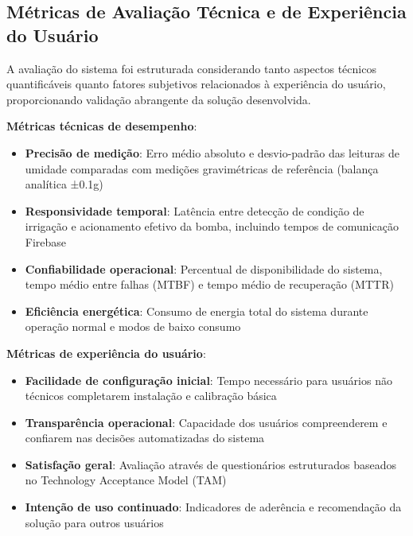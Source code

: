 
\subsection{Métricas de Avaliação Técnica e de Experiência do Usuário}

A avaliação do sistema foi estruturada considerando tanto aspectos técnicos quantificáveis quanto fatores subjetivos relacionados à experiência do usuário, proporcionando validação abrangente da solução desenvolvida.

\textbf{Métricas técnicas de desempenho}:
\begin{itemize}
\item \textbf{Precisão de medição}: Erro médio absoluto e desvio-padrão das leituras de umidade comparadas com medições gravimétricas de referência (balança analítica ±0.1g)
\item \textbf{Responsividade temporal}: Latência entre detecção de condição de irrigação e acionamento efetivo da bomba, incluindo tempos de comunicação Firebase
\item \textbf{Confiabilidade operacional}: Percentual de disponibilidade do sistema, tempo médio entre falhas (MTBF) e tempo médio de recuperação (MTTR)
\item \textbf{Eficiência energética}: Consumo de energia total do sistema durante operação normal e modos de baixo consumo
\end{itemize}

\textbf{Métricas de experiência do usuário}:
\begin{itemize}
\item \textbf{Facilidade de configuração inicial}: Tempo necessário para usuários não técnicos completarem instalação e calibração básica
\item \textbf{Transparência operacional}: Capacidade dos usuários compreenderem e confiarem nas decisões automatizadas do sistema
\item \textbf{Satisfação geral}: Avaliação através de questionários estruturados baseados no Technology Acceptance Model (TAM)
\item \textbf{Intenção de uso continuado}: Indicadores de aderência e recomendação da solução para outros usuários
\end{itemize}

